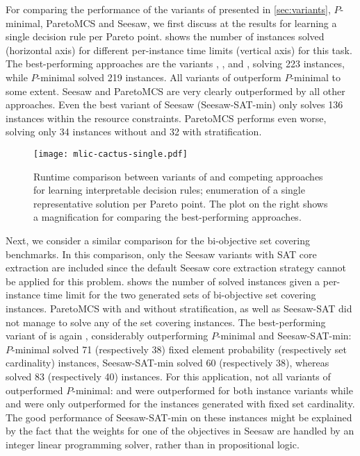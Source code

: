 For comparing the performance of the variants of \algname{} presented in \cref{sec:variants}, $P$-minimal, ParetoMCS and Seesaw, we first discuss at the results for learning a single decision rule per Pareto point.
 shows the number of instances solved (horizontal axis) for different per-instance time limits (vertical axis) for this task.
The best-performing approaches are the \algname{} variants \msh{}, \satunsat{}, \unsatsat{} and \msu{}, solving 223 instances, while $P$-minimal solved 219 instances.
All variants of \algname{} outperform $P$-minimal to some extent.
Seesaw and ParetoMCS are very clearly outperformed by all other approaches.
Even the best variant of Seesaw (Seesaw-SAT-min) only solves 136 instances within the resource constraints.
ParetoMCS performs even worse, solving only 34 instances without and 32 with stratification.

\begin{figure}
  \centering
  \texttt{[image: mlic-cactus-single.pdf]}
  \caption{Runtime comparison between variants of \algname{} and competing approaches for learning interpretable decision rules;
    enumeration of a single representative solution per Pareto point.
    The plot on the right shows a magnification for comparing the best-performing approaches.
  }\label{fig:mlic-cactus-single}
\end{figure}

Next, we consider a similar comparison for the bi-objective set covering benchmarks.
In this comparison, only the Seesaw variants with SAT core extraction are included since the default Seesaw core extraction strategy cannot be applied for this problem.
 shows the number of solved instances given a per-instance time limit for the two generated sets of bi-objective set covering instances.
ParetoMCS with and without stratification, as well as Seesaw-SAT did not manage to solve any of the set covering instances.
The best-performing variant of \algname{} is again \msh{}, considerably outperforming $P$-minimal and Seesaw-SAT-min:
$P$-minimal solved 71 (respectively 38) fixed element probability (respectively set cardinality) instances, Seesaw-SAT-min solved 60 (respectively 38), whereas \msh{} solved 83 (respectively 40) instances.
For this application, not all variants of \algname{} outperformed $P$-minimal:
\msu{} and \oll{} were outperformed for both instance variants while \satunsat{} and \unsatsat{} were only outperformed for the instances generated with fixed set cardinality.
The good performance of Seesaw-SAT-min on these instances might be explained by the fact that the weights for one of the objectives in Seesaw are handled by an integer linear programming solver, rather than in propositional logic.

